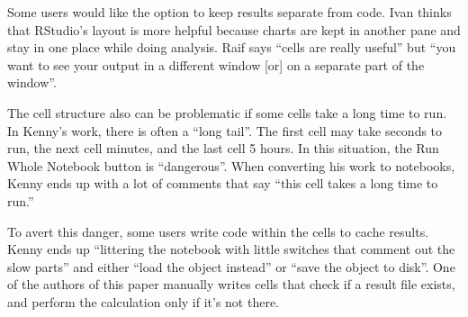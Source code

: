 Some users would like the option to keep results separate from code.
Ivan thinks that RStudio's layout is more helpful because charts
are kept in another pane and stay in one place while doing analysis. Raif says
``cells are really useful'' but ``you want to see your output in a different
window [or] on a separate part of the window''.

The cell structure also can be problematic if some cells take a long time to
run. In Kenny's work, there is often a ``long tail''.  The first cell may take
seconds to run, the next cell minutes, and the last cell 5 hours.  In this
situation, the Run Whole Notebook button is ``dangerous''. When converting
his work to notebooks, Kenny ends up with a lot of comments that say ``this cell
takes a long time to run.''

To avert this danger, some users write code within the cells to
cache results. Kenny ends up ``littering the notebook with little switches that
comment out the slow parts'' and either ``load the object instead'' or ``save
the object to disk''. One of the authors of this paper manually writes cells
that check if a result file exists, and perform the calculation only if it's not
there.






